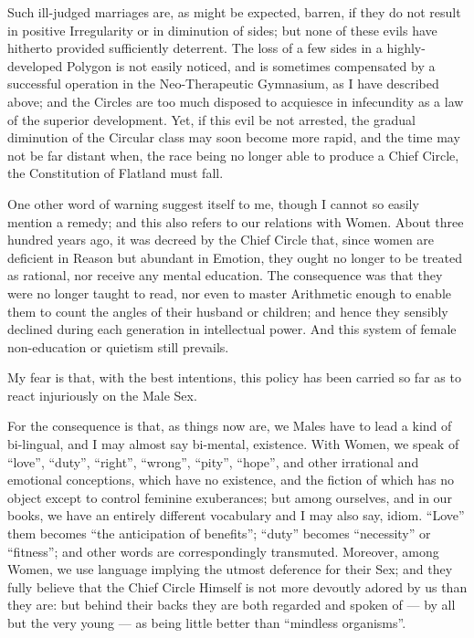 \documentclass[10pt, kindle, oneside]{kindle}
\begin{document}
Such ill-judged marriages are, as might be expected, barren, if they do not
result in positive Irregularity or in diminution of sides; but none of these
evils have hitherto provided sufficiently deterrent. The loss of a few sides
in a highly-developed Polygon is not easily noticed, and is sometimes
compensated by a successful operation in the Neo-Therapeutic Gymnasium, as I
have described above; and the Circles are too much disposed to acquiesce in
infecundity as a law of the superior development. Yet, if this evil be not
arrested, the gradual diminution of the Circular class may soon become more
rapid, and the time may not be far distant when, the race being no longer able
to produce a Chief Circle, the Constitution of Flatland must fall.

One other word of warning suggest itself to me, though I cannot so easily
mention a remedy; and this also refers to our relations with Women. About
three hundred years ago, it was decreed by the Chief Circle that, since women
are deficient in Reason but abundant in Emotion, they ought no longer to be
treated as rational, nor receive any mental education. The consequence was
that they were no longer taught to read, nor even to master Arithmetic enough
to enable them to count the angles of their husband or children; and hence
they sensibly declined during each generation in intellectual power. And this
system of female non-education or quietism still prevails.

My fear is that, with the best intentions, this policy has been carried so far
as to react injuriously on the Male Sex.

For the consequence is that, as things now are, we Males have to lead a kind
of bi-lingual, and I may almost say bi-mental, existence. With Women, we speak
of ``love'', ``duty'', ``right'', ``wrong'', ``pity'', ``hope'', and other irrational and
emotional conceptions, which have no existence, and the fiction of which has
no object except to control feminine exuberances; but among ourselves, and in
our books, we have an entirely different vocabulary and I may also say, idiom.
``Love'' them becomes ``the anticipation of benefits''; ``duty'' becomes ``necessity''
or ``fitness''; and other words are correspondingly transmuted. Moreover, among
Women, we use language implying the utmost deference for their Sex; and they
fully believe that the Chief Circle Himself is not more devoutly adored by us
than they are: but behind their backs they are both regarded and spoken of ---
by all but the very young --- as being little better than ``mindless organisms''.
\end{document}
